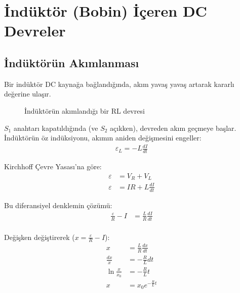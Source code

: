 \documentclass[11pt,letterpaper,twocolumn]{fenbil}
\begin{document}
\section{İndüktör (Bobin) İçeren DC Devreler}

\subsection{İndüktörün Akımlanması}

Bir indüktör DC kaynağa bağlandığında, akım yavaş yavaş artarak kararlı değerine ulaşır.

\begin{figure}[h]
\centering
{}
\caption{İndüktörün akımlandığı bir RL devresi}
\end{figure}

$S_1$ anahtarı kapatıldığında (ve $S_2$ açıkken), devreden akım geçmeye başlar. İndüktörün öz indüksiyonu, akımın aniden değişmesini engeller:
\begin{align}
\varepsilon_L = -L\frac{dI}{dt}
\end{align}

Kirchhoff Çevre Yasası'na göre:
\begin{align}
\varepsilon &= V_R + V_L\\
\varepsilon &= IR + L\frac{dI}{dt}
\end{align}

Bu diferansiyel denklemin çözümü:
\begin{align}
\frac{\varepsilon}{R} - I &= \frac{L}{R}\frac{dI}{dt}\\
\end{align}

Değişken değiştirerek ($x = \frac{\varepsilon}{R} - I$):
\begin{align}
x &= \frac{L}{R}\frac{dx}{dt}\\
\frac{dx}{x} &= -\frac{R}{L}dt\\
\ln\frac{x}{x_0} &= -\frac{R}{L}t\\
x &= x_0 e^{-\frac{R}{L}t}
\end{align}
\end{document}
